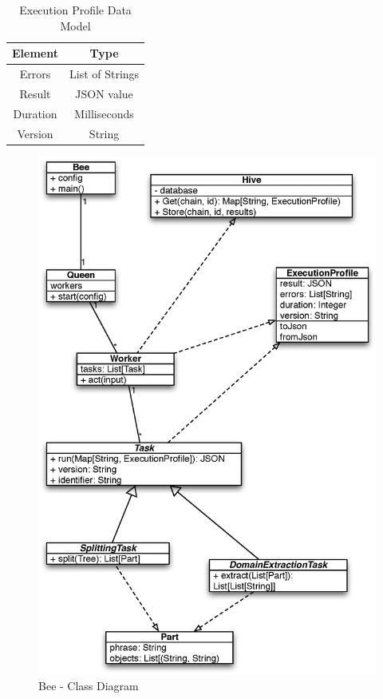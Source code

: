 
\begin{table}
  \caption{Execution Profile Data Model}
  \label{tab:execution_profile}
  
  \begin{center}
    \begin{tabular}{c | c}
      Element & Type\\
      \hline
      Errors & List of Strings\\
      Result & JSON value\\
      Duration & Milliseconds\\
      Version & String\\
    \end{tabular}
  \end{center}
\end{table}

\begin{figure}[ht!]
  \begin{center}
    \includegraphics[width=\linewidth]{images/beeuml}
  \end{center}
  \caption{Bee - Class Diagram}\label{fig:beeuml}
\end{figure}



